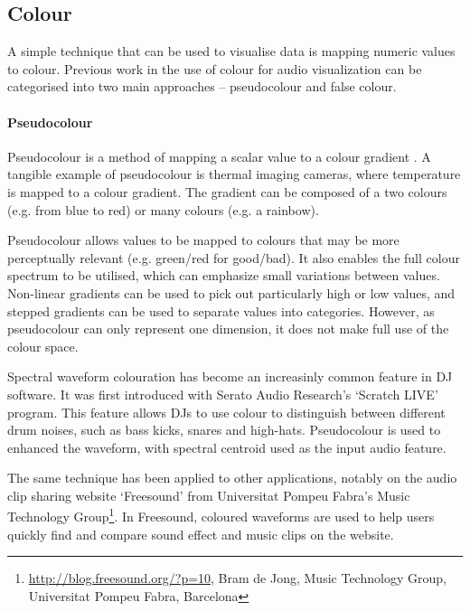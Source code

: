 
\subsection{Colour}\label{sec:background-colour} A simple technique that can be used to visualise data is mapping
numeric values to colour.  Previous work in the use of colour for audio visualization can be categorised into two main
approaches -- pseudocolour and false colour.

\paragraph{Pseudocolour}\label{sec:background-pseudocolour} Pseudocolour is a method of mapping a scalar value to a
colour gradient \citep{Moreland2009}.  A tangible example of pseudocolour is thermal imaging cameras, where temperature
is mapped to a colour gradient.  The gradient can be composed of a two colours (e.g. from blue to red) or many colours
(e.g. a rainbow).

Pseudocolour allows values to be mapped to colours that may be more perceptually relevant (e.g. green/red for
good/bad).  It also enables the full colour spectrum to be utilised, which can emphasize small variations between
values.  Non-linear gradients can be used to pick out particularly high or low values, and stepped gradients can be
used to separate values into categories.  However, as pseudocolour can only represent one dimension, it does not make
full use of the colour space.

Spectral waveform colouration has become an increasinly common feature in DJ software. It was first introduced with
Serato Audio Research's `Scratch LIVE' program.
This feature allows DJs to use colour to distinguish between different drum noises, such as bass kicks, snares and
high-hats. Pseudocolour is used to enhanced the waveform, with spectral centroid used as the input audio feature.

The same technique has been applied to other applications, notably on the audio clip sharing website `Freesound' from
Universitat Pompeu Fabra's Music Technology Group\footnote{\url{http://blog.freesound.org/?p=10}, Bram de Jong, Music
  Technology Group, Universitat Pompeu Fabra, Barcelona}. In Freesound, coloured waveforms are used to help users
quickly find and compare sound effect and music clips on the website.


